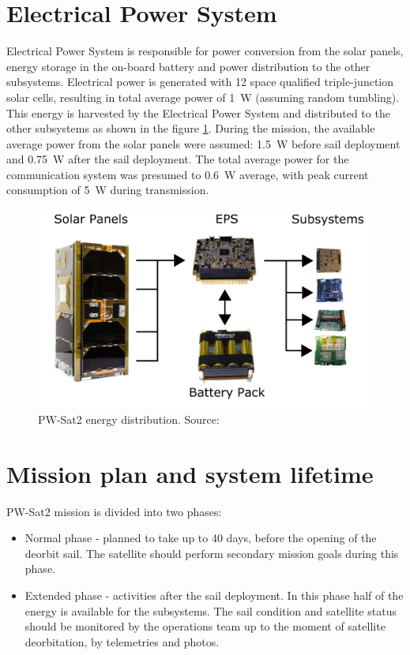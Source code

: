 \section{Electrical Power System}
Electrical Power System is responsible for power conversion from the solar panels, energy storage in the on-board battery and power distribution to the other subsystems. Electrical power is generated with \si{12} space qualified triple-junction solar cells, resulting in total average power of \SI{1}{\watt} (assuming random tumbling). This energy is harvested by the Electrical Power System and distributed to the other subsystems as shown in the figure \ref{pwsat_eps_distribution}. During the mission, the available average power from the solar panels were assumed: \SI{1.5}{\watt} before sail deployment and \SI{0.75}{\watt} after the sail deployment. The total average power for the communication system was presumed to \SI{0.6}{\watt} average, with peak current consumption of \SI{5}{\watt} during transmission.
\begin{figure}
    \centering
    \includegraphics[width=0.7\paperwidth]{img/3/pwsat_eps_distribution.png}
    \caption{PW-Sat2 energy distribution. Source: \cite{PW_sat2_photo}}
    \label{pwsat_eps_distribution}
\end{figure}

\section{Mission plan and system lifetime}
PW-Sat2 mission is divided into two phases:
\begin{itemize}
    \item Normal phase - planned to take up to 40 days, before the opening of the deorbit sail. The satellite should perform secondary mission goals during this phase.
    \item Extended phase - activities after the sail deployment. In this phase half of the energy is available for the subsystems. The sail condition and satellite status should be monitored by the operations team up to the moment of satellite deorbitation, by telemetries and photos.
\end{itemize}

